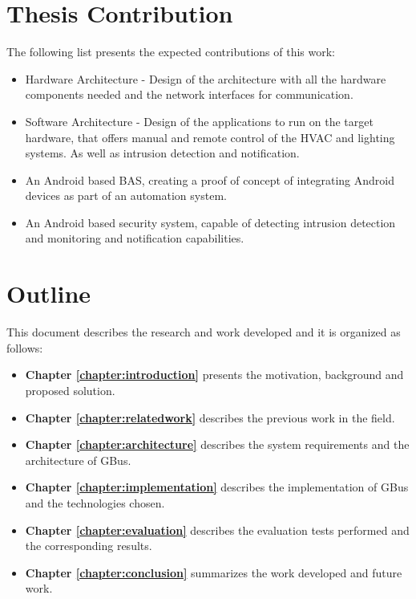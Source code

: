 \section{Thesis Contribution}
\label{section:contribution}

The following list presents the expected contributions of this work:

\begin{itemize}
    \item Hardware Architecture - Design of the architecture with all the hardware components needed and the network interfaces for communication.
    \item Software Architecture - Design of the applications to run on the target hardware, that offers manual and remote control of the HVAC and lighting systems. As well as intrusion detection and notification.
    \item An Android based BAS, creating a proof of concept of integrating Android devices as part of an automation system.
    \item An Android based security system, capable of detecting intrusion detection and monitoring and notification capabilities.
    
\end{itemize}

\section{Outline}
This document describes the research and work developed and it is organized as follows:

\begin{itemize}
\item \textbf{Chapter \ref{chapter:introduction}} presents the motivation, background and proposed solution.
\item \textbf{Chapter \ref{chapter:relatedwork}} describes the previous work in the field.
\item \textbf{Chapter \ref{chapter:architecture}} describes the system requirements and the architecture of GBus.
\item \textbf{Chapter \ref{chapter:implementation}} describes the implementation of GBus and the technologies chosen.
\item \textbf{Chapter \ref{chapter:evaluation}} describes the evaluation tests performed and the corresponding results.
\item \textbf{Chapter \ref{chapter:conclusion}} summarizes the work developed and future work.
\end{itemize}

\cleardoublepage
